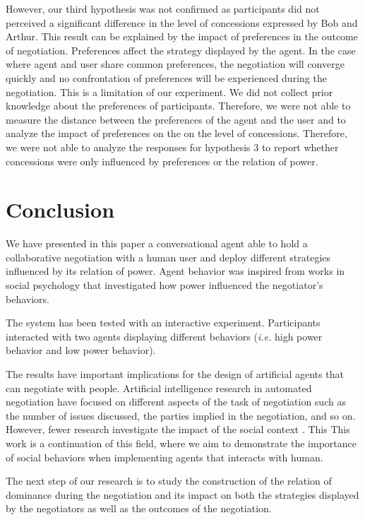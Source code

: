 \documentclass[runningheads,a4paper]{llncs}
\begin{document}
		However, our third hypothesis was not confirmed as participants did not perceived a significant difference in the level of concessions expressed by Bob and Arthur. This result can be explained by the impact of preferences in the outcome of negotiation. Preferences affect the strategy displayed by the agent. In the case where agent and user share common preferences, the negotiation will converge quickly and no confrontation of preferences will be experienced during the negotiation. This is a limitation of our experiment. We did not collect prior knowledge about the preferences of participants. Therefore, we were not able to measure the distance between the preferences of the agent and the user and to analyze the impact of preferences on the on the level of concessions. Therefore, we were not able to analyze the responses for hypothesis 3 to report whether concessions were only influenced by preferences or the relation of power.
		
		\section{Conclusion}
		
		We have presented in this paper a conversational agent able to hold a collaborative negotiation with a human user and deploy different strategies influenced by its relation of power. Agent behavior was inspired from works in social psychology that investigated how power influenced the negotiator's behaviors.
		
		 The system has been tested with an interactive experiment. Participants interacted with two agents displaying different behaviors (\textit{i.e.} high power behavior and low power behavior).
		 
		 The results have important implications for the design of artificial agents that can negotiate with people. Artificial intelligence research in automated negotiation have focused on different aspects of the task of negotiation such as the number of issues discussed, the parties implied in the negotiation, and so on. However, fewer research investigate the impact of the social context \cite{de2011effect,nazari2015opponent}. This This work is a continuation of this field, where we aim to demonstrate the importance of social behaviors when implementing agents that interacts with human. %
		
		The next step of our research is to study the construction of the relation of dominance during the negotiation and its impact on both the strategies displayed by the negotiators as well as the outcomes of the negotiation.
		

		
		
\end{document}
